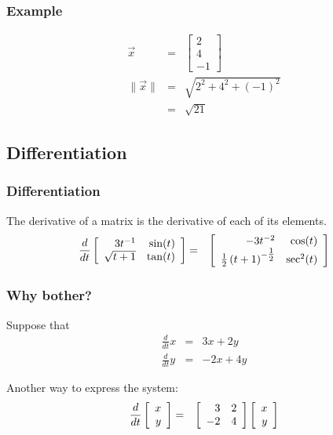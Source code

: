 \begin{frame}
  \frametitle{Example}

  \begin{eqnarray*}
    \vec{x} & = & 
    \left[
      \begin{array}{r}
        2 \\ 4 \\ -1
      \end{array} \right] \\
      \| \vec{x} \| & = & \sqrt{2^2 + 4^2 + (-1)^2} \\
      & = & \sqrt{21}
  \end{eqnarray*}

\end{frame}




\subsection{Differentiation}

\begin{frame}
  \frametitle{Differentiation}

  The derivative of a matrix is the derivative of each of its elements.
  \begin{eqnarray*}
    \frac{d}{dt} \left[ \begin{array}{rr} 3t^{-1} & \sin(t) \\ \sqrt{t+1} & \tan(t) \end{array} \right] & = & 
    \left[ \begin{array}{rr} -3t^{-2} & \cos(t) \\ \mbox{$\frac{1}{2}$}\left( t+1\right)^{-\mbox{$\frac{1}{2}$}} & \sec^2(t) \end{array} \right]
  \end{eqnarray*}

\end{frame}

\begin{frame}
  \frametitle{Why bother?}

  Suppose that
  \begin{eqnarray*}
    \frac{d}{dt} x & = & 3x + 2y \\
    \frac{d}{dt} y & = & -2 x + 4 y
  \end{eqnarray*}

  Another way to express the system:
  \begin{eqnarray*}
    \frac{d}{dt} \left[ \begin{array}{r} x \\ y \end{array} \right] & = & \left[ \begin{array}{rr} 3 & 2 \\ -2 & 4 \end{array} \right] \left[ \begin{array}{r} x \\ y \end{array} \right]
  \end{eqnarray*}

\end{frame}


